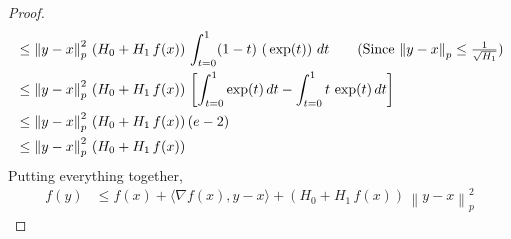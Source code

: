 \documentclass{article}
\newcommand{\normsq}[1]{\left\|#1 \right\|^{2}}
\newcommand{\norm}[1]{\left\|#1 \right\|}
\begin{document}
\begin{proof}
\begin{align*}
& \leq  \normsq{y - x}_p \, (H_0 + H_1 \, f(x))\, \int_{t = 0}^{1} (1-t) \, \left( \, \exp(  t   )  \right)\, dt \tag{Since $\norm{y - x}_p \leq \frac{1}{\sqrt{H_1}}$} \\
& \leq \normsq{y - x}_p \, (H_0 + H_1 \, f(x))\, \left[\int_{t = 0}^{1} \exp(t) \, dt - \int_{t = 0}^{1} t \, \exp(t) \, dt \right]  \\
& \leq \normsq{y - x}_p \, (H_0 + H_1 \, f(x))\, (e-2)  \\
& \leq \normsq{y - x}_p \, (H_0 + H_1 \, f(x))\\
\end{align*}
Putting everything together, 
\begin{align*}
f(y) &\leq f(x) + \langle \nabla f(x), y - x \rangle + \left(H_0 + H_1 \, f(x) \right) \, \normsq{y - x}_p
\end{align*}
\end{proof}
\end{document}
